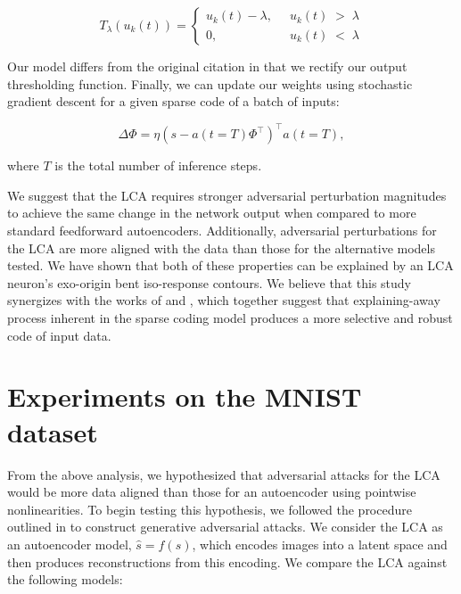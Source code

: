 \begin{equation}\label{lcathresholdfunc}
    T_{\lambda}(u_{k}(t)) = \left\{
    \begin{aligned}
        u_{k}(t)-\lambda,\;\; &u_{k}(t)\; >\; \lambda \\
        0,\;\; &u_{k}(t)\; <\; \lambda
    \end{aligned}
    \right.
\end{equation}

Our model differs from the original citation in that we rectify our output thresholding function. Finally, we can update our weights using stochastic gradient descent for a given sparse code of a batch of inputs:

\begin{equation}\label{phiupdate}
  \Delta \Phi = \eta (s - a(t=T)\Phi^{\top})^{\top} a(t=T),
\end{equation}

where $T$ is the total number of inference steps.

We suggest that the LCA requires stronger adversarial perturbation magnitudes to achieve the same change in the network output when compared to more standard feedforward autoencoders. Additionally, adversarial perturbations for the LCA are more aligned with the data than those for the alternative models tested. We have shown that both of these properties can be explained by an LCA neuron's exo-origin bent iso-response contours. We believe that this study synergizes with the works of \cite{zhu2013visual} and \cite{golden2016conjectures}, which together suggest that explaining-away process inherent in the sparse coding model produces a more selective and robust code of input data.


\section{Experiments on the MNIST dataset}
From the above analysis, we hypothesized that adversarial attacks for the LCA would be more data aligned than those for an autoencoder using pointwise nonlinearities. To begin testing this hypothesis, we followed the procedure outlined in \cite{kos2018adversarial} to construct generative adversarial attacks. We consider the LCA as an autoencoder model, $\hat{s}=f(s)$, which encodes images into a latent space and then produces reconstructions from this encoding. We compare the LCA against the following models:

